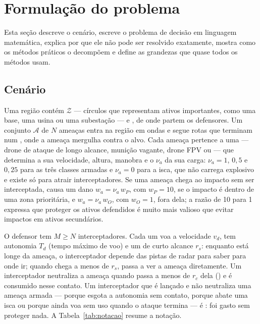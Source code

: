 \section{Formulação do problema}\label{sec:problema}

Esta seção descreve o cenário, escreve o problema de decisão em linguagem matemática, explica por que ele não pode ser
resolvido exatamente, mostra como os métodos práticos o decompõem e define as grandezas que quase todos os métodos usam.

\subsection{Cenário}
Uma região contém  $\mathcal{Z}$ --- círculos que representam ativos importantes, como uma
base, uma usina ou uma subestação --- e , de onde partem os defensores. Um conjunto
$\mathcal{A}$ de $N$ ameaças entra na região em ondas e segue rotas que terminam num , onde a
ameaça mergulha contra o alvo. Cada ameaça pertence a uma  --- drone de ataque de longo alcance,
munição vagante, drone FPV ou  --- que determina a sua velocidade, altura, manobra e o  $\nu_a$ da sua carga: $\nu_a=1$, $0{,}5$ e $0{,}25$ para as três classes armadas e $\nu_a=0$ para a isca, que não
carrega explosivo e existe só para atrair interceptadores. Se uma ameaça chega ao impacto sem ser interceptada, causa um
dano $w_a=\nu_a\,w_P$, com $w_P=10$, se o impacto é dentro de uma zona prioritária, e $w_a=\nu_a\,w_O$, com $w_O=1$, fora
dela; a razão de 10 para 1 expressa que proteger os ativos defendidos é muito mais valioso que evitar impactos em ativos
secundários.

O defensor tem $M\ge N$ interceptadores. Cada um voa a velocidade $v_d$, tem autonomia $T_d$ (tempo máximo de voo) e um
 de curto alcance $r_s$: enquanto está longe da ameaça, o interceptador depende das pistas de radar
para saber para onde ir; quando chega a menos de $r_s$, passa a ver a ameaça diretamente. Um interceptador neutraliza a
ameaça quando passa a menos de $r_c$ dela () e é consumido nesse contato. Um interceptador que é
lançado e não neutraliza uma ameaça armada --- porque esgota a autonomia sem contato, porque abate uma isca ou porque
ainda voa sem uso quando o ataque termina --- é : foi gasto sem proteger nada. A
Tabela~\ref{tab:notacao} resume a notação.

